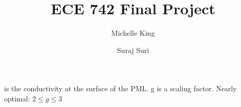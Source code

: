 \message{ !name(ECE742Project.tex)}\documentclass{article}
\title{ECE 742 Final Project}
\author{
  Michelle King
  \and
  Suraj Suri
  }
\begin{document}
 is the conductivity at the surface of the PML.
g is a scaling factor. Nearly optimal: $2 \leq g \leq 3$

\end{document}
